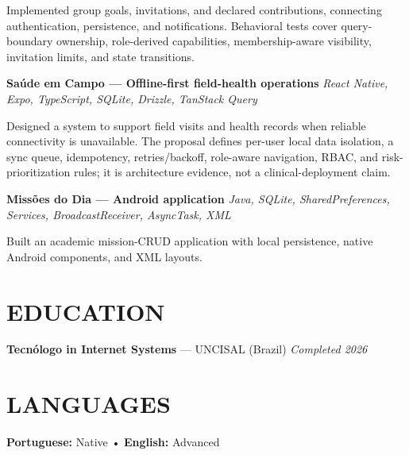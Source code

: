 \documentclass[10pt,a4paper]{article}
\begin{document}
\footnotesize

Implemented group goals, invitations, and declared contributions, connecting authentication, persistence, and notifications. Behavioral tests cover query-boundary ownership, role-derived capabilities, membership-aware visibility, invitation limits, and state transitions.

\vspace{0.5pt}

\noindent
\textbf{Saúde em Campo — Offline-first field-health operations}
\hfill
\textit{React Native, Expo, TypeScript, SQLite, Drizzle, TanStack Query}

\footnotesize

Designed a system to support field visits and health records when reliable connectivity is unavailable. The proposal defines per-user local data isolation, a sync queue, idempotency, retries/backoff, role-aware navigation, RBAC, and risk-prioritization rules; it is architecture evidence, not a clinical-deployment claim.

\vspace{0.5pt}

\noindent
\textbf{Missões do Dia — Android application}
\hfill
\textit{Java, SQLite, SharedPreferences, Services, BroadcastReceiver, AsyncTask, XML}

\footnotesize

Built an academic mission-CRUD application with local persistence, native Android components, and XML layouts.

\section*{EDUCATION}

\noindent
\textbf{Tecnólogo in Internet Systems} — UNCISAL (Brazil)
\hfill
\textit{Completed 2026}


\section*{LANGUAGES}

\noindent
\textbf{Portuguese:} Native
\quad • \quad
\textbf{English:} Advanced
\end{document}
